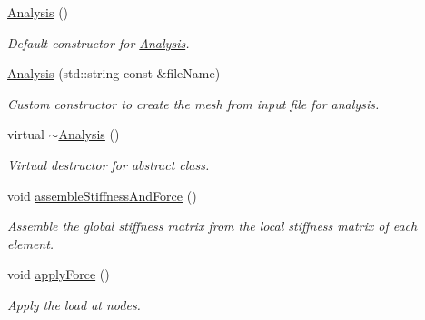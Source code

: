 \begin{DoxyCompactItemize}
\item 
\mbox{\label{class_analysis_a1cf251eb8dc62b30815ab5548ad88f73}} 
\mbox{\hyperlink{class_analysis_a1cf251eb8dc62b30815ab5548ad88f73}{Analysis}} ()
\begin{DoxyCompactList}\small\item\em Default constructor for \mbox{\hyperlink{class_analysis}{Analysis}}. \end{DoxyCompactList}\item 
\mbox{\hyperlink{class_analysis_aae14526bb70c6372fd662b46aab74d2d}{Analysis}} (std\+::string const \&file\+Name)
\begin{DoxyCompactList}\small\item\em Custom constructor to create the mesh from input file for analysis. \end{DoxyCompactList}\item 
\mbox{\label{class_analysis_a172ae0a3cbb68daa373baf081f5c00d9}} 
virtual \mbox{\hyperlink{class_analysis_a172ae0a3cbb68daa373baf081f5c00d9}{$\sim$\+Analysis}} ()
\begin{DoxyCompactList}\small\item\em Virtual destructor for abstract class. \end{DoxyCompactList}\item 
\mbox{\label{class_analysis_afd0f91272761f958cff70fe4671418ea}} 
void \mbox{\hyperlink{class_analysis_afd0f91272761f958cff70fe4671418ea}{assemble\+Stiffness\+And\+Force}} ()
\begin{DoxyCompactList}\small\item\em Assemble the global stiffness matrix from the local stiffness matrix of each element. \end{DoxyCompactList}\item 
\mbox{\label{class_analysis_ab1c7b59927d7787ef75b0bba651b045c}} 
void \mbox{\hyperlink{class_analysis_ab1c7b59927d7787ef75b0bba651b045c}{apply\+Force}} ()
\begin{DoxyCompactList}\small\item\em Apply the load at nodes. \end{DoxyCompactList}\item 
\mbox{\label{class_analysis_aec157316b08568c84d8d8344a724ff89}} 

\end{DoxyCompactItemize}
